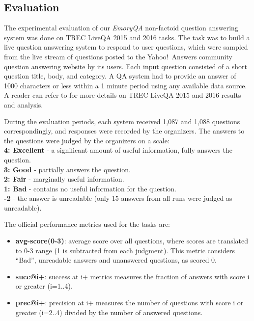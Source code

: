 \subsection{Evaluation}
\label{section:non-factoid:system:evaluation}

The experimental evaluation of our \textit{EmoryQA} non-factoid question answering system was done on TREC LiveQA 2015 and 2016 tasks.
The task was to build a live question answering system to respond to user questions, which were sampled from the live stream of questions posted to the Yahoo!~Answers community question answering website by its users.
Each input question consisted of a short question title, body, and category.
A QA system had to provide an answer of 1000 characters or less within a 1 minute period using any available data source.
A reader can refer to \cite{overviewliveqa15,overviewliveqa16} for more details on TREC LiveQA 2015 and 2016 results and analysis.

During the evaluation periods, each system received 1,087 and 1,088 questions correspondingly, and responses were recorded by the organizers.
The answers to the questions were judged by the organizers on a scale:\\
\textbf{4: Excellent} - a significant amount of useful information, fully answers the question.\\
\textbf{3: Good} - partially answers the question.\\
\textbf{2: Fair} - marginally useful information.\\
\textbf{1: Bad} - contains no useful information for the question.\\
\textbf{-2} - the answer is unreadable (only 15 answers from all runs were judged as unreadable).

The official performance metrics used for the tasks are:
\begin{itemize}
\item \textbf{avg-score(0-3)}: average score over all questions, where scores are translated to 0-3 range (1 is subtracted from each judgment). This metric considers ``Bad'', unreadable answers and unanswered questions, as scored 0.
\item \textbf{succ@i+}: success at i+ metrics measures the fraction of answers with score i or greater (i=1..4).
\item \textbf{prec@i+}: precision at i+ measures the number of questions with score i or greater (i=2..4) divided by the number of answered questions.
\end{itemize}

